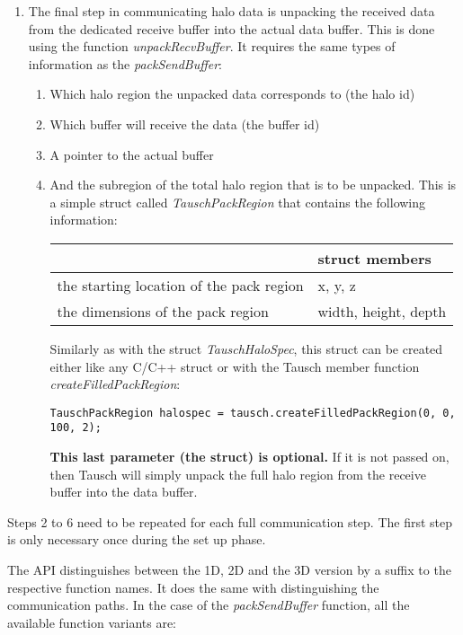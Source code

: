 \documentclass{article}
\begin{document}
\begin{enumerate}
    \item The final step in communicating halo data is unpacking the received data from the dedicated receive buffer into the actual data buffer. This is done using the function \emph{unpackRecvBuffer}. It requires the same types of information as the \emph{packSendBuffer}:
    \begin{enumerate}
        \item Which halo region the unpacked data corresponds to (the halo id)
        \item Which buffer will receive the data (the buffer id)
        \item A pointer to the actual buffer
        \item And the subregion of the total halo region that is to be unpacked. This is a simple struct called \emph{TauschPackRegion} that contains the following information:
        \begin{table}[ht]\centering
        \begin{tabular}{|l|l|}
            \hline
            \rowcolor{black!10}
            & \bfseries struct members\\
            \hline
            the starting location of the pack region & x, y, z \\
            the dimensions of the pack region & width, height, depth \\
            \hline
        \end{tabular}
        \end{table}

        Similarly as with the struct \emph{TauschHaloSpec}, this struct can be created either like any C/C++ struct or with the Tausch member function \emph{createFilledPackRegion}:
        \begin{lstlisting}
TauschPackRegion halospec = tausch.createFilledPackRegion(0, 0, 100, 2);
        \end{lstlisting}

        \textbf{This last parameter (the struct) is optional.} If it is not passed on, then Tausch will simply unpack the full halo region from the receive buffer into the data buffer.
    \end{enumerate}
\end{enumerate}

Steps 2 to 6 need to be repeated for each full communication step. The first step is only necessary once during the set up phase.

The API distinguishes between the 1D, 2D and the 3D version by a suffix to the respective function names. It does the same with distinguishing the communication paths. In the case of the \emph{packSendBuffer} function, all the available function variants are:
\end{document}
